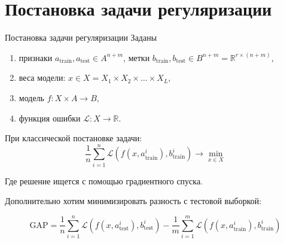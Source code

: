 \documentclass[10pt,pdf,hyperref={unicode}]{beamer}
\begin{document}
\section{Постановка задачи регуляризации}
\begin{frame}{Постановка задачи регуляризации}
Заданы
\begin{enumerate}[1)]
    \item признаки $a_\text{train}, a_\text{test} \in A^{n+m}$, метки $b_\text{train}, b_\text{test} \in B^{n+m} = \mathbb{R}^{r \times (n+m)}$,
    \item веса модели: $x \in X = X_1 \times X_2 \times \ldots \times X_L$,
    \item модель $f: X \times A \to B$,
    \item функция ошибки $\mathcal{L}: X \to \mathbb{R}$.
\end{enumerate}

\bigskip

При классической постановке задачи: 
\[
	\frac{1}{n} \sum_{i=1}^{n} \mathcal{L}(f(x, a_\text{train}^i), b_\text{train}^i) \to \min_{x \in X}
\]

Где решение ищется с помощью градиентного спуска.
\bigskip

Дополнительно хотим минимизировать разность с тестовой выборкой:

\[
    \text{GAP} = \frac{1}{n} \sum_{i=1}^{n} \mathcal{L}(f(x, a_\text{test}^i), b_\text{test}^i) - \frac{1}{m} \sum_{i=1}^{m} \mathcal{L}(f(x, a_\text{train}^i), b_\text{train}^i)
\]

\end{frame}

\end{document}
